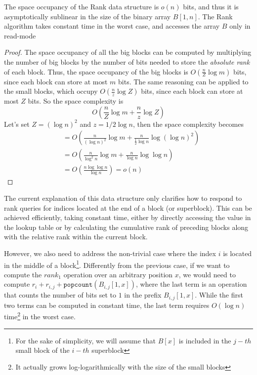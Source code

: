 \begin{theorem} \label{th:rank}
    The space occupancy of the Rank data structure is $o(n)$ bits, and thus it is asymptotically sublinear in the size of the binary array $B[1, n]$. The Rank algorithm takes constant time in the worst case, and accesses the array $B$ only in read-mode
\end{theorem}
\begin{proof}
    The space occupancy of all the big blocks can be computed by multiplying the number of big blocks by the number of bits needed to store the \emph{absolute rank} of each block. Thus, the space occupancy of the big blocks is $O(\frac{n}{Z} \log m)$ bits, since each block can store at most $m$ bits. The same reasoning can be applied to the small blocks, which occupy $O(\frac{n}{z} \log Z)$ bits, since each block can store at most $Z$ bits. So the space complexity is
    \begin{equation}
        O\left(\frac{n}{Z} \log m + \frac{n}{z} \log Z\right)
    \end{equation}
    Let's set $Z = (\log n)^2$ and $z = 1/2 \log n$, then the space complexity becomes
    \begin{align}
         & = O\left(\frac{n}{(\log n)^2} \log m + \frac{n}{\frac{1}{2} \log n} \log (\log n)^2\right) \\
         & = O\left(\frac{n}{\log^2n} \log m + \frac{n}{\log n} \log \log n\right)                    \\
         & = O\left(\frac{n \log \log n}{\log n} \right)= o(n)
    \end{align}
\end{proof}

\noindent The current explanation of this data structure only clarifies how to respond to rank queries for indices located at the end of a block (or superblock). This can be achieved efficiently, taking constant time, either by directly accessing the value in the lookup table or by calculating the cumulative rank of preceding blocks along with the relative rank within the current block. \vspace{0.4cm}

\noindent However, we also need to address the non-trivial case where the index $i$ is located in the middle of a block\footnote{For the sake of simplicity, we will assume that $B[x]$ is included in the $j-th$ small block of the $i-th$ superblock}. Differently from the previous case, if we want to compute the $rank_1$ operation over an arbitrary position $x$, we would need to compute $r_i + r_{i,j} + \texttt{popcount}(B_{i,j}[1,x])$, where the last term is an operation that counts the number of bits set to $1$ in the prefix $B_{i,j}[1,x]$. While the first two terms can be computed in constant time, the last term requires $O(\log n)$ time\footnote{It actually grows log-logarithmically with the size of the small blocks} in the worst case.

